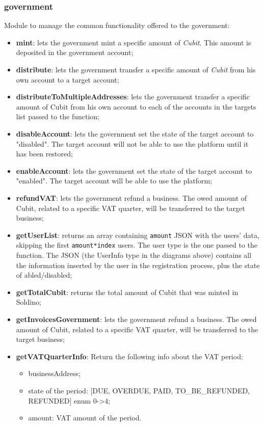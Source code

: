 \subsubsection{government}
Module to manage the common functionality offered to the government:
\begin{itemize}
	\item \textbf{mint}: lets the government mint a specific amount of \textit{Cubit}. This amount is deposited in the government account;
	\item \textbf{distribute}: lets the government transfer a specific amount of \textit{Cubit} from his own account to a target account;
	\item \textbf{distributeToMultipleAddresses}: lets the government transfer a specific amount of Cubit from his own account to each of the accounts in the targets list passed to the function;
	\item \textbf{disableAccount}: lets the government set the state of the target account to "disabled". The target account will not be able to use the platform until it has been restored;
	\item \textbf{enableAccount}: lets the government set the state of the target account to "enabled". The target account will be able to use the platform;
	\item \textbf{refundVAT}: lets the government refund a business. The owed amount of Cubit, related to a specific VAT quarter, will be transferred to the target business;
	\item \textbf{getUserList}: returns an array containing \texttt{amount} JSON with the users' data, skipping the first \texttt{amount*index} users. The user type is the one passed to the function. The JSON (the UserInfo type in the diagrams above) contains all the information inserted by the user in the registration process, plus the state of abled/disabled;
	\item \textbf{getTotalCubit}: returns the total amount of Cubit that was minted in Soldino;
	
	\item \textbf{getInvoicesGovernment}: lets the government refund a business. The owed amount of Cubit, related to a specific VAT quarter, will be transferred to the target business;
	
	\item \textbf{getVATQuarterInfo}: Return the following info about the VAT period:
	\begin{itemize}
		\item businessAddress;
		\item state of the period: [DUE, OVERDUE, PAID, TO\_BE\_REFUNDED, REFUNDED] enum 0->4;
		\item amount: VAT amount of the period.
	\end{itemize} 
\end{itemize}
